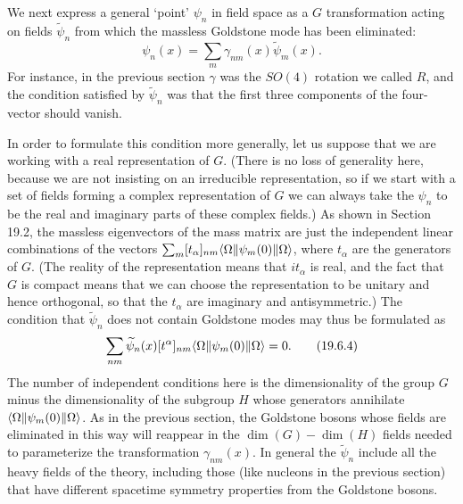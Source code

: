 We next express a general `point' $\psi_n$ in field space as a $G$ transformation acting on fields $\widetilde\psi_n$ from which the massless Goldstone mode has been eliminated:
\begin{equation}
\psi_n(x)=\sum_m\gamma_{nm}(x)\widetilde\psi_m(x).
\tag{19.6.3}\label{eq:19.6.3}
\end{equation}
For instance, in the previous section $\gamma$ was the $SO(4)$ rotation we called $R$, and the condition satisfied by $\widetilde\psi_n$ was that the first three components of the four-vector should vanish.

In order to formulate this condition more generally, let us suppose that we are working with a real representation of $G$. (There is no loss of generality here, because we are not insisting on an irreducible representation, so if we start with a set of fields forming a complex representation of $G$ we can always take the $\psi_n$ to be the real and imaginary parts of these complex fields.) As shown in Section 19.2, the massless eigenvectors of the mass matrix are just the independent linear combinations of the vectors $\sum_m[t_\alpha]_{nm}\langle \Omega\rVert\psi_m(0)\lVert \Omega\rangle$, where $t_\alpha$ are the generators of $G$. (The reality of the representation means that $it_\alpha$ is real, and the fact that $G$ is compact means that we can choose the representation to be unitary and hence orthogonal, so that the $t_\alpha$ are imaginary and antisymmetric.) The condition that $\widetilde\psi_n$ does not contain Goldstone modes may thus be formulated as
\begin{equation}
\sum_{nm}\widetilde\psi_n(x)[t^\alpha]_{nm}
\langle \Omega\rVert\psi_m(0)\lVert \Omega\rangle=0.
\tag{19.6.4}\label{eq:19.6.4}
\end{equation}
The number of independent conditions here is the dimensionality of the group $G$ minus the dimensionality of the subgroup $H$ whose generators annihilate $\langle \Omega\rVert\psi_m(0)\lVert \Omega\rangle$. As in the previous section, the Goldstone bosons whose fields are eliminated in this way will reappear in the $\dim(G)-\dim(H)$ fields needed to parameterize the transformation $\gamma_{nm}(x)$. In general the $\widetilde\psi_n$ include all the heavy fields of the theory, including those (like nucleons in the previous section) that have different spacetime symmetry properties from the Goldstone bosons.

